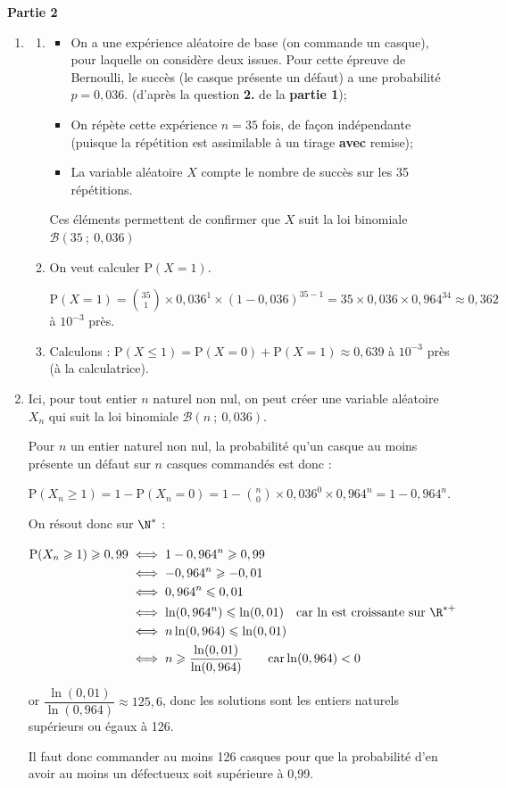\textbf{Partie 2}
\begin{enumerate}
\item 
	\begin{enumerate}
		\item 
		
\begin{itemize}
\item On a une expérience aléatoire de base (on commande un casque), pour laquelle on considère deux issues. Pour cette épreuve de Bernoulli, le succès (le casque présente un défaut) a une probabilité $p = 0,036$. (d'après la question \textbf{2.} de la \textbf{partie 1});
\item On répète cette expérience $n=35$ fois, de façon indépendante (puisque la répétition est assimilable à un tirage \textbf{avec} remise);
\item La variable aléatoire $X$ compte le nombre de succès sur les 35 répétitions.
\end{itemize}

Ces éléments permettent de confirmer que $X$ suit la loi binomiale $ \mathcal{B}(35~;~0,036) $

\item On veut calculer $\mathrm{P}(X = 1)$.

$ \mathrm{P}(X = 1) = \displaystyle \binom{35}{1} \times 0,036^1 \times (1 - 0,036)^{35- 1} = 35 \times 0,036 \times 0,964^{34} \approx 0,362 $ à $ 10^{-3} $ près.

\item Calculons : $\mathrm{P}(X \leqslant 1) = \mathrm{P}(X = 0) + \mathrm{P}(X = 1) \approx 0,639$ à $ 10^{-3} $ près (à la calculatrice).
	\end{enumerate}

	\item Ici, pour tout entier $n$ naturel non nul, on peut créer une variable aléatoire $X_n$ qui suit la loi binomiale $ \mathcal{B}(n~;~0,036) $.

	Pour $n$ un entier naturel non nul, la probabilité qu'un casque au moins présente un défaut sur $n$ casques commandés est donc :

$\mathrm{P}(X_n \geqslant 1) = 1 - \mathrm{P} (X_n = 0) = 1 - \displaystyle \binom{n}{0}\times 0,036^0 \times 0,964^{n} = 1 - 0,964^{n}$.

On résout donc sur $\N^*$ :

$\aligned[t] \mathrm{P}(X_n \geqslant 1) \geqslant 0,99
&\iff 1 - 0,964^{n} \geqslant 0,99\\
&\iff -0,964^n \geqslant -0,01\\
&\iff 0,964^n \leqslant 0,01\\
&\iff \ln(0,964^n) \leqslant \ln(0,01) \quad \text{car ln est croissante sur }\R^{*+} \\
&\iff n\ln(0,964) \leqslant \ln(0,01)\\
&\iff n \geqslant \dfrac{\ln(0,01)}{\ln(0,964)} \qquad \text{car} \ln(0,964) <0
\endaligned$

or $\dfrac{\ln(0,01)}{\ln(0,964)}\approx 125,6$, donc les solutions sont les entiers naturels supérieurs ou égaux à 126.

Il faut donc commander au moins 126 casques pour que la probabilité d'en avoir au moins un défectueux soit supérieure à 0,99.

\end{enumerate}

\bigskip

